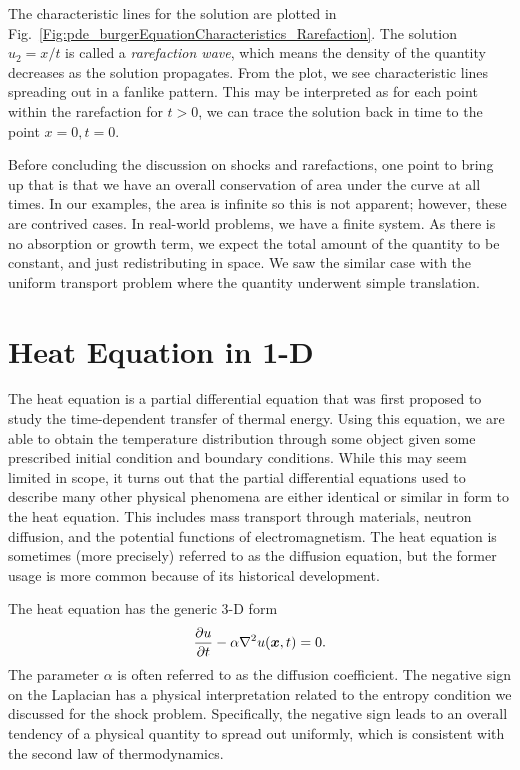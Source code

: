 The characteristic lines for the solution are plotted in Fig.~\ref{Fig:pde_burgerEquationCharacteristics_Rarefaction}. The solution $u_2 = x/t$ is called a \emph{rarefaction wave}, which means the density of the quantity decreases as the solution propagates. From the plot, we see characteristic lines spreading out in a fanlike pattern. This may be interpreted as for each point within the rarefaction for $t > 0$, we can trace the solution back in time to the point $x = 0, t = 0$.

Before concluding the discussion on shocks and rarefactions, one point to bring up that is that we have an overall conservation of area under the curve at all times. In our examples, the area is infinite so this is not apparent; however, these are contrived cases. In real-world problems, we have a finite system. As there is no absorption or growth term, we expect the total amount of the quantity to be constant, and just redistributing in space. We saw the similar case with the uniform transport problem where the quantity underwent simple translation.


\section{Heat Equation in 1-D}

The heat equation is a partial differential equation that was first proposed to study the time-dependent transfer of thermal energy. Using this equation, we are able to obtain the temperature distribution through some object given some prescribed initial condition and boundary conditions. While this may seem limited in scope, it turns out that the partial differential equations used to describe many other physical phenomena are either identical or similar in form to the heat equation. This includes mass transport through materials, neutron diffusion, and the potential functions of electromagnetism. The heat equation is sometimes (more precisely) referred to as the diffusion equation, but the former usage is more common because of its historical development.

The heat equation has the generic 3-D form
\begin{align}
  \frac{ \partial {u} }{ \partial {t} } - \alpha \nabla^2 u(\bm{x},t) = 0.
\end{align}
The parameter $\alpha$ is often referred to as the diffusion coefficient. The negative sign on the Laplacian has a physical interpretation related to the entropy condition we discussed for the shock problem. Specifically, the negative sign leads to an overall tendency of a physical quantity to spread out uniformly, which is consistent with the second law of thermodynamics.


